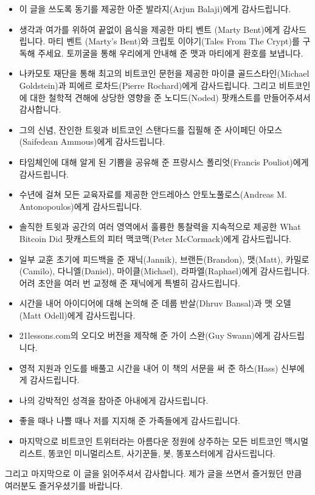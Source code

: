 \begin{itemize}
\begin{comment}
  \item Thanks to my wife for putting up with me and my obsessive nature.
  \item Thanks to my family for supporting me during both the good times and the bad.
  \item Last but not least, thanks to all the bitcoin maximalists, shitcoin minimalists, shills, bots, and shitposters which reside in the beautiful garden that is Bitcoin twitter.
\end{comment}
	\item 이 글을 쓰도록 동기를 제공한 아준 발라지(Arjun Balaji)에게 감사드립니다.
	\item 생각과 여가를 위하여 끝없이 음식을 제공한 마티 벤트 (Marty Bent)에게 감사드립니다. 마티 벤트 (Marty’s Bent)와 크립토 이야기(Tales From The Crypt)를 구독해 주세요. 토끼굴을 통해 우리에게 안내해 준 맷과 마티에게 환호를 보냅니다.
	\item 나카모토 재단을 통해 최고의 비트코인 문헌을 제공한 마이클 골드스타인(Michael Goldstein)과 피에르 로차드(Pierre Rochard)에게 감사드립니다. 그리고 비트코인에 대한 철학적 견해에 상당한 영향을 준 노디드(Noded) 팟캐스트를 만들어주셔서 감사합니다.
	\item 그의 신념, 잔인한 트윗과 비트코인 스탠다드를 집필해 준 사이페딘 아모스(Saifedean Ammous)에게 감사드립니다.
	\item 타임체인에 대해 알게 된 기쁨을 공유해 준 프랑시스 폴리엇(Francis Pouliot)에게 감사드립니다.
	\item 수년에 걸쳐 모든 교육자료를 제공한 안드레아스 안토노풀로스(Andreas M. Antonopoulos)에게 감사드립니다.
	\item 솔직한 트윗과 공간의 여러 영역에서 훌륭한 통찰력을 지속적으로 제공한 What Bitcoin Did 팟캐스트의 피터 맥코맥(Peter McCormack)에게 감사드립니다.
	\item 일부 교훈 초기에 피드백을 준 재닉(Jannik), 브랜든(Brandon), 맷(Matt), 카밀로(Camilo), 다니엘(Daniel), 마이클(Michael), 라파엘(Raphael)에게 감사드립니다. 어려 초안을 여러 번 교정해 준 재닉에게 특별히 감사드립니다.
	\item 시간을 내어 아이디어에 대해 논의해 준 데룹 반살(Dhruv Bansal)과 맷 오델(Matt Odell)에게 감사드립니다.
	\item 21lessons.com의 오디오 버전을 제작해 준 가이 스완(Guy Swann)에게 감사드립니다.
	\item 영적 지원과 인도를 배풀고 시간을 내어 이 책의 서문을 써 준 하스(Hass) 신부에게 감사드립니다.
	\item 나의 강박적인 성격을 참아준 아내에게 감사드립니다.
	\item 좋을 때나 나쁠 때나 저를 지지해 준 가족들에게 감사드립니다.
	\item 마지막으로 비트코인 트위터라는 아름다운 정원에 상주하는 모든 비트코인 맥시멀리스트, 똥코인 미니멀리스트, 사기꾼들, 봇, 똥포스터에게 감사드립니다.
\end{itemize}


그리고 마지막으로 이 글을 읽어주셔서 감사합니다. 
제가 글을 쓰면서 즐거웠던 만큼 여러분도 즐거우셨기를 바랍니다.

